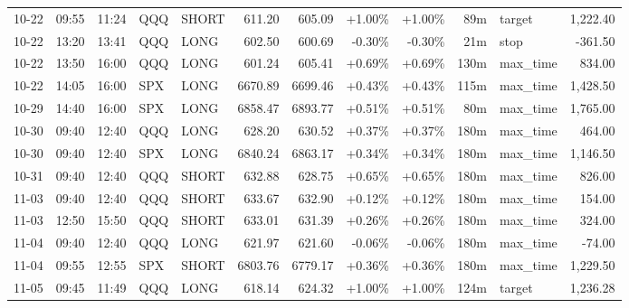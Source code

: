\documentclass[11pt,a4paper,twoside]{article}
\begin{document}
\begin{center}
\begin{longtable}{>{\color{txtmain}}l l l l l r r r r r >{\color{txtmain}}l r}
10-22 & 09:55 & 11:24 & QQQ & SHORT & 611.20 & 605.09 & \textcolor{wingreen}{+1.00\%} & \textcolor{wingreen}{+1.00\%} & 89m & target & \textcolor{wingreen}{1,222.40} \\
10-22 & 13:20 & 13:41 & QQQ & LONG & 602.50 & 600.69 & \textcolor{lossred}{-0.30\%} & \textcolor{lossred}{-0.30\%} & 21m & stop & \textcolor{lossred}{-361.50} \\
10-22 & 13:50 & 16:00 & QQQ & LONG & 601.24 & 605.41 & \textcolor{wingreen}{+0.69\%} & \textcolor{wingreen}{+0.69\%} & 130m & max\_time & \textcolor{wingreen}{834.00} \\
10-22 & 14:05 & 16:00 & SPX & LONG & 6670.89 & 6699.46 & \textcolor{wingreen}{+0.43\%} & \textcolor{wingreen}{+0.43\%} & 115m & max\_time & \textcolor{wingreen}{1,428.50} \\
10-29 & 14:40 & 16:00 & SPX & LONG & 6858.47 & 6893.77 & \textcolor{wingreen}{+0.51\%} & \textcolor{wingreen}{+0.51\%} & 80m & max\_time & \textcolor{wingreen}{1,765.00} \\
10-30 & 09:40 & 12:40 & QQQ & LONG & 628.20 & 630.52 & \textcolor{wingreen}{+0.37\%} & \textcolor{wingreen}{+0.37\%} & 180m & max\_time & \textcolor{wingreen}{464.00} \\
10-30 & 09:40 & 12:40 & SPX & LONG & 6840.24 & 6863.17 & \textcolor{wingreen}{+0.34\%} & \textcolor{wingreen}{+0.34\%} & 180m & max\_time & \textcolor{wingreen}{1,146.50} \\
10-31 & 09:40 & 12:40 & QQQ & SHORT & 632.88 & 628.75 & \textcolor{wingreen}{+0.65\%} & \textcolor{wingreen}{+0.65\%} & 180m & max\_time & \textcolor{wingreen}{826.00} \\
11-03 & 09:40 & 12:40 & QQQ & SHORT & 633.67 & 632.90 & \textcolor{wingreen}{+0.12\%} & \textcolor{wingreen}{+0.12\%} & 180m & max\_time & \textcolor{wingreen}{154.00} \\
11-03 & 12:50 & 15:50 & QQQ & SHORT & 633.01 & 631.39 & \textcolor{wingreen}{+0.26\%} & \textcolor{wingreen}{+0.26\%} & 180m & max\_time & \textcolor{wingreen}{324.00} \\
11-04 & 09:40 & 12:40 & QQQ & LONG & 621.97 & 621.60 & \textcolor{lossred}{-0.06\%} & \textcolor{lossred}{-0.06\%} & 180m & max\_time & \textcolor{lossred}{-74.00} \\
11-04 & 09:55 & 12:55 & SPX & SHORT & 6803.76 & 6779.17 & \textcolor{wingreen}{+0.36\%} & \textcolor{wingreen}{+0.36\%} & 180m & max\_time & \textcolor{wingreen}{1,229.50} \\
11-05 & 09:45 & 11:49 & QQQ & LONG & 618.14 & 624.32 & \textcolor{wingreen}{+1.00\%} & \textcolor{wingreen}{+1.00\%} & 124m & target & \textcolor{wingreen}{1,236.28} \\

\end{longtable}
\end{center}
\end{document}
